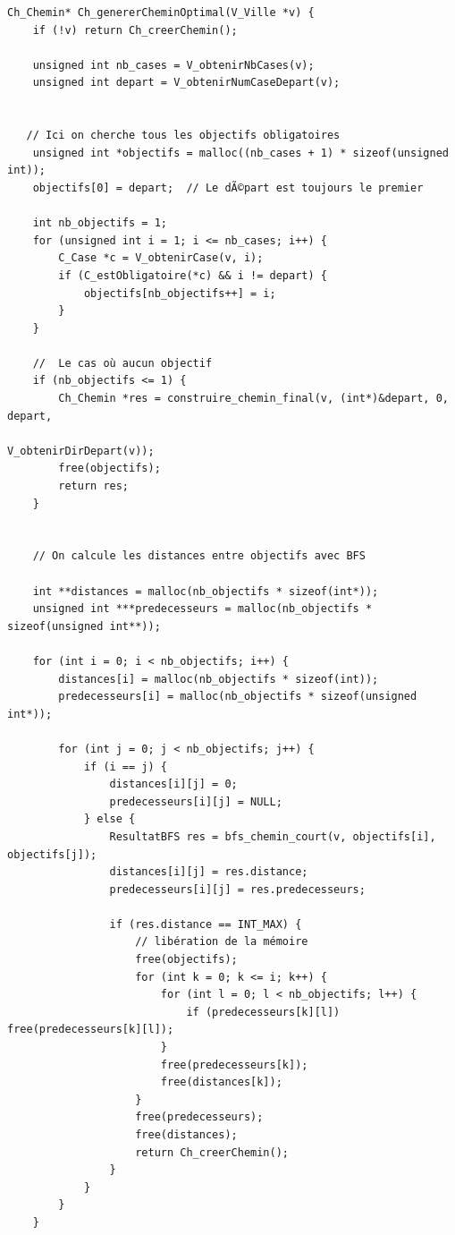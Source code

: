 \begin{lstlisting}[caption={Ch\_genererCheminOptimal}]
Ch_Chemin* Ch_genererCheminOptimal(V_Ville *v) {
    if (!v) return Ch_creerChemin();

    unsigned int nb_cases = V_obtenirNbCases(v);
    unsigned int depart = V_obtenirNumCaseDepart(v);
    
   
   // Ici on cherche tous les objectifs obligatoires  
    unsigned int *objectifs = malloc((nb_cases + 1) * sizeof(unsigned int));
    objectifs[0] = depart;  // Le dÃ©part est toujours le premier
    
    int nb_objectifs = 1;
    for (unsigned int i = 1; i <= nb_cases; i++) {
        C_Case *c = V_obtenirCase(v, i);
        if (C_estObligatoire(*c) && i != depart) {
            objectifs[nb_objectifs++] = i;
        }
    }
    
    //  Le cas où aucun objectif
    if (nb_objectifs <= 1) {
        Ch_Chemin *res = construire_chemin_final(v, (int*)&depart, 0, depart, 
                                                 V_obtenirDirDepart(v));
        free(objectifs);
        return res;
    }
    
    
    // On calcule les distances entre objectifs avec BFS
    
    int **distances = malloc(nb_objectifs * sizeof(int*));
    unsigned int ***predecesseurs = malloc(nb_objectifs * sizeof(unsigned int**));
    
    for (int i = 0; i < nb_objectifs; i++) {
        distances[i] = malloc(nb_objectifs * sizeof(int));
        predecesseurs[i] = malloc(nb_objectifs * sizeof(unsigned int*));
        
        for (int j = 0; j < nb_objectifs; j++) {
            if (i == j) {
                distances[i][j] = 0;
                predecesseurs[i][j] = NULL;
            } else {
                ResultatBFS res = bfs_chemin_court(v, objectifs[i], objectifs[j]);
                distances[i][j] = res.distance;
                predecesseurs[i][j] = res.predecesseurs;
                
                if (res.distance == INT_MAX) {
                    // libération de la mémoire
                    free(objectifs);
                    for (int k = 0; k <= i; k++) {
                        for (int l = 0; l < nb_objectifs; l++) {
                            if (predecesseurs[k][l]) free(predecesseurs[k][l]);
                        }
                        free(predecesseurs[k]);
                        free(distances[k]);
                    }
                    free(predecesseurs);
                    free(distances);
                    return Ch_creerChemin();
                }
            }
        }
    }
    

\end{lstlisting}

